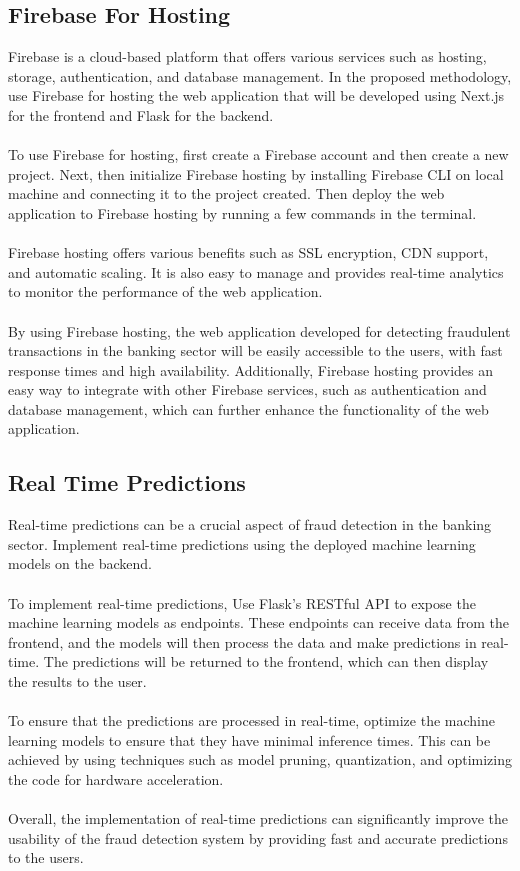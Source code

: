 \subsection{Firebase For Hosting}
Firebase is a cloud-based platform that offers various services such as hosting, storage, authentication, and 
database management. In the proposed methodology, use Firebase for hosting the web application that 
will be developed using Next.js for the frontend and Flask for the backend.\\\\
To use Firebase for hosting, first create a Firebase account and then create a new project. Next, then 
initialize Firebase hosting by installing Firebase CLI on local machine and connecting it to the project 
created. Then deploy the web application to Firebase hosting by running a few commands in the 
terminal.\\\\
Firebase hosting offers various benefits such as SSL encryption, CDN support, and automatic scaling. It is also 
easy to manage and provides real-time analytics to monitor the performance of the web application.\\\\
By using Firebase hosting, the web application developed for detecting fraudulent transactions in the banking 
sector will be easily accessible to the users, with fast response times and high availability. Additionally, 
Firebase hosting provides an easy way to integrate with other Firebase services, such as authentication and 
database management, which can further enhance the functionality of the web application.

\subsection{Real Time Predictions}
Real-time predictions can be a crucial aspect of fraud detection in the banking sector. Implement 
real-time predictions using the deployed machine learning models on the backend.\\\\
To implement real-time predictions, Use Flask's RESTful API to expose the machine learning models as 
endpoints. These endpoints can receive data from the frontend, and the models will then process the data and 
make predictions in real-time. The predictions will be returned to the frontend, which can then display the 
results to the user.\\\\
To ensure that the predictions are processed in real-time, optimize the machine learning models to 
ensure that they have minimal inference times. This can be achieved by using techniques such as model pruning, 
quantization, and optimizing the code for hardware acceleration.\\\\
Overall, the implementation of real-time predictions can significantly improve the usability of the fraud 
detection system by providing fast and accurate predictions to the users.

